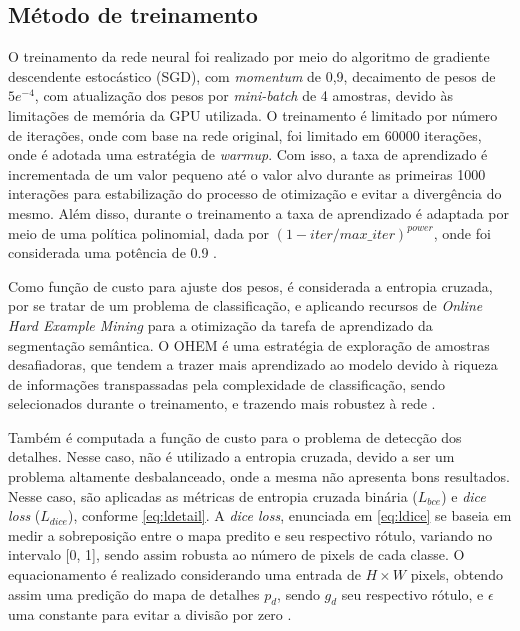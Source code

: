 \documentclass[conference]{IEEEtran}
\begin{document}
\subsection{Método de treinamento}


O treinamento da rede neural foi realizado por meio do algoritmo de gradiente descendente estocástico (SGD), com \textit{momentum} de 0,9, decaimento de pesos de $5e^{-4}$, com atualização dos pesos por \textit{mini-batch} de 4 amostras, devido às limitações de memória da GPU utilizada. O treinamento é limitado por número de iterações, onde com base na rede original, foi limitado em 60000 iterações, onde é adotada uma estratégia de \textit{warmup}. Com isso, a taxa de aprendizado é incrementada de um valor pequeno até o valor alvo durante as primeiras 1000 interações para estabilização do processo de otimização e evitar a divergência do mesmo. Além disso, durante o treinamento a taxa de aprendizado é adaptada por meio de uma política polinomial, dada por $(1 - iter/max\_iter)^{power}$, onde foi considerada uma potência de 0.9 \cite{fan2021RethinkingBiSeNetRealtime}.

Como função de custo para ajuste dos pesos, é considerada a entropia cruzada, por se tratar de um problema de classificação, e aplicando recursos de \textit{Online Hard Example Mining} para a otimização da tarefa de aprendizado da segmentação semântica. O OHEM é uma estratégia de exploração de amostras desafiadoras, que tendem a trazer mais aprendizado ao modelo devido à riqueza de informações transpassadas pela complexidade de classificação, sendo selecionados durante o treinamento, e trazendo mais robustez à rede \cite{shrivastava2016TrainingRegionbasedObject}. 

Também é computada a função de custo para o problema de detecção dos detalhes. Nesse caso, não é utilizado a entropia cruzada, devido a ser um problema altamente desbalanceado, onde a mesma não apresenta bons resultados. Nesse caso, são aplicadas as métricas de entropia cruzada binária ($L_{bce}$) e \textit{dice loss} ($L_{dice}$), conforme \eqref{eq:ldetail}. A \textit{dice loss}, enunciada em \eqref{eq:ldice} se baseia em medir a sobreposição entre o mapa predito e seu respectivo rótulo, variando no intervalo [0, 1], sendo assim robusta ao número de pixels de cada classe. O equacionamento é realizado considerando uma entrada de $H \times W$ pixels, obtendo assim uma predição do mapa de detalhes $p_d$, sendo $g_d$ seu respectivo rótulo, e $\epsilon$ uma constante para evitar a divisão por zero \cite{deng2018LearningPredictCrisp}.
\end{document}
